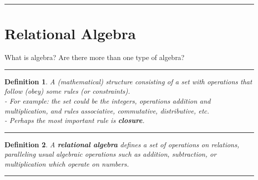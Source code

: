 \documentclass{article}
\newtheorem{definition}{Definition}
\begin{document}
 
\hspace{-0.5cm}\rule[0.01in]{\textwidth}{0.0025in}
   
  
  
  
  
  
  
  
\section{Relational Algebra } 
  
  What is algebra?  Are there more than one type of algebra?
  
  \hspace{-0.5cm}\rule[0.01in]{\textwidth}{0.0025in}
  \begin{definition}
        A (mathematical) structure consisting of a set with operations that follow (obey) some rules (or constraints).\\

\noindent  - For example: the set could be the integers, operations addition and multiplication, and rules associative, commutative, distributive, etc.  \\
 
\noindent - Perhaps the most important rule is \textbf{closure}.  

  \end{definition}
  
  \hspace{-0.5cm}\rule[0.01in]{\textwidth}{0.0025in}
  
  \begin{definition}
   A \textbf{relational algebra} defines a set of operations on relations, paralleling usual algebraic operations such as addition, subtraction, or multiplication which operate on numbers.  
  \end{definition}
  
  \hspace{-0.5cm}\rule[0.01in]{\textwidth}{0.0025in}
  
\end{document}
